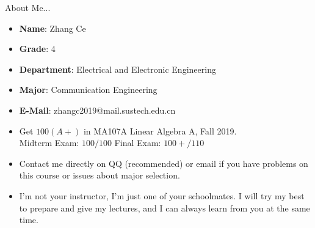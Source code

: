 \documentclass{beamer}
\begin{document}
\begin{frame}{About Me...}
\begin{itemize}
    \item \textbf{Name}: Zhang Ce
    \item \textbf{Grade}: 4
    \item \textbf{Department}: Electrical and Electronic Engineering
    \item \textbf{Major}: Communication Engineering
    \item \textbf{E-Mail}: zhangc2019@mail.sustech.edu.cn
    \item Get $100 (A+)$ in MA107A Linear Algebra A, Fall 2019. \\
    \vspace{3pt}
    Midterm Exam: $100/100$ \qquad Final Exam: $100+/110$
    \item Contact me directly on QQ (recommended) or email if you have problems on this course or issues about major selection.
    \item I'm not your instructor, I'm just one of your schoolmates. I will try my best to prepare and give my lectures, and I can always learn from you at the same time.
\end{itemize}

\end{frame}
\end{document}
